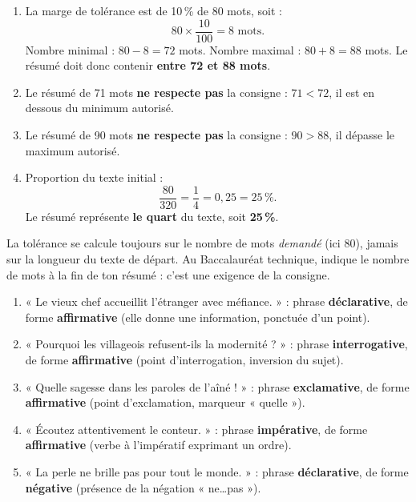 \documentclass[11pt]{article}
\begin{document}
\begin{corrige}
\begin{enumerate}
\item La marge de tolérance est de 10\,\% de 80 mots, soit :
\[ 80 \times \frac{10}{100} = 8 \text{ mots.} \]
Nombre minimal : $80 - 8 = 72$ mots. Nombre maximal : $80 + 8 = 88$ mots. Le résumé doit donc contenir \textbf{entre 72 et 88 mots}.
\item Le résumé de 71 mots \textbf{ne respecte pas} la consigne : $71 < 72$, il est en dessous du minimum autorisé.
\item Le résumé de 90 mots \textbf{ne respecte pas} la consigne : $90 > 88$, il dépasse le maximum autorisé.
\item Proportion du texte initial :
\[ \frac{80}{320} = \frac{1}{4} = 0,25 = 25\,\%. \]
Le résumé représente \textbf{le quart} du texte, soit \textbf{25\,\%}.
\end{enumerate}
\end{corrige}

\begin{attention}
La tolérance se calcule toujours sur le nombre de mots \emph{demandé} (ici 80), jamais sur la longueur du texte de départ. Au Baccalauréat technique, indique le nombre de mots à la fin de ton résumé : c'est une exigence de la consigne.
\end{attention}

\begin{corrige}
\begin{enumerate}
\item « Le vieux chef accueillit l'étranger avec méfiance. » : phrase \textbf{déclarative}, de forme \textbf{affirmative} (elle donne une information, ponctuée d'un point).
\item « Pourquoi les villageois refusent-ils la modernité ? » : phrase \textbf{interrogative}, de forme \textbf{affirmative} (point d'interrogation, inversion du sujet).
\item « Quelle sagesse dans les paroles de l'aîné ! » : phrase \textbf{exclamative}, de forme \textbf{affirmative} (point d'exclamation, marqueur « quelle »).
\item « Écoutez attentivement le conteur. » : phrase \textbf{impérative}, de forme \textbf{affirmative} (verbe à l'impératif exprimant un ordre).
\item « La perle ne brille pas pour tout le monde. » : phrase \textbf{déclarative}, de forme \textbf{négative} (présence de la négation « ne\ldots pas »).
\end{enumerate}
\end{corrige}
\end{document}
